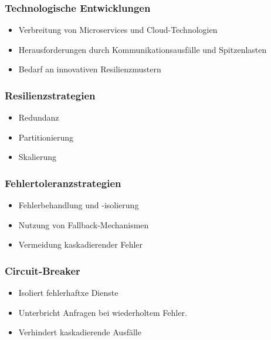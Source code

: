 \begin{frame}
    \frametitle{Technologische Entwicklungen}
    \begin{itemize}
        \item Verbreitung von Microservices und Cloud-Technologien
        \item Herausforderungen durch Kommunikationsausfälle und Spitzenlasten
        \item Bedarf an innovativen Resilienzmustern
    \end{itemize}
\end{frame}


\begin{frame}
    \frametitle{Resilienzstrategien}
    \begin{itemize}
        \item Redundanz
        \item Partitionierung
        \item Skalierung
    \end{itemize}
\end{frame}

\begin{frame}
    \frametitle{Fehlertoleranzstrategien}
    \begin{itemize}
        \item Fehlerbehandlung und -isolierung
        \item Nutzung von Fallback-Mechanismen
        \item Vermeidung kaskadierender Fehler
    \end{itemize}
\end{frame}



\begin{frame}
    \frametitle{Circuit-Breaker}
    \begin{itemize}
        \item Isoliert fehlerhaftxe Dienste
        \item Unterbricht Anfragen bei wiederholtem Fehler.
        \item Verhindert kaskadierende Ausfälle
    \end{itemize}
\end{frame}

